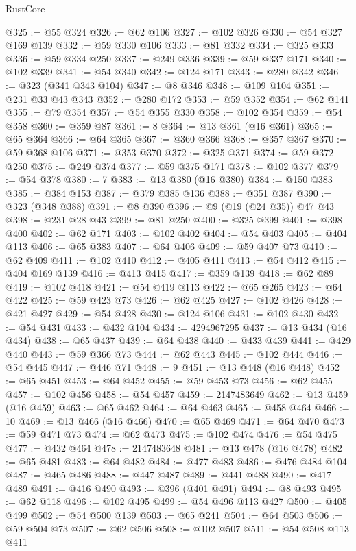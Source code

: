 \begin{lexlean}{RustCore}
\begin{coremodule}
@325 := @55 @324
@326 := @62 @106
@327 := @102 @326
@330 := @54 @327 @169 @139
@332 := @59 @330 @106
@333 := @81 @332
@334 := @325 @333
@336 := @59 @334 @250
@337 := @249 @336
@339 := @59 @337 @171
@340 := @102 @339
@341 := @54 @340
@342 := @124 @171
@343 := @280 @342
@346 := @323 (@341 @343 @104)
@347 := @8 @346
@348 := @109 @104
@351 := @231 @33 @43 @343
@352 := @280 @172
@353 := @59 @352
@354 := @62 @141
@355 := @79 @354
@357 := @54 @355 @330
@358 := @102 @354
@359 := @54 @358
@360 := @359 @87
@361 := 8
@364 := @13 @361 (@16 @361)
@365 := @65 @364
@366 := @64 @365
@367 := @360 @366
@368 := @357 @367
@370 := @59 @368 @106
@371 := @353 @370
@372 := @325 @371
@374 := @59 @372 @250
@375 := @249 @374
@377 := @59 @375 @171
@378 := @102 @377
@379 := @54 @378
@380 := 7
@383 := @13 @380 (@16 @380)
@384 := @150 @383
@385 := @384 @153
@387 := @379 @385 @136
@388 := @351 @387
@390 := @323 (@348 @388)
@391 := @8 @390
@396 := @9 (@19 (@24 @35)) @47 @43
@398 := @231 @28 @43
@399 := @81 @250
@400 := @325 @399
@401 := @398 @400
@402 := @62 @171
@403 := @102 @402
@404 := @54 @403
@405 := @404 @113
@406 := @65 @383
@407 := @64 @406
@409 := @59 @407 @73
@410 := @62 @409
@411 := @102 @410
@412 := @405 @411
@413 := @54 @412
@415 := @404 @169 @139
@416 := @413 @415
@417 := @359 @139
@418 := @62 @89
@419 := @102 @418
@421 := @54 @419 @113
@422 := @65 @265
@423 := @64 @422
@425 := @59 @423 @73
@426 := @62 @425
@427 := @102 @426
@428 := @421 @427
@429 := @54 @428
@430 := @124 @106
@431 := @102 @430
@432 := @54 @431
@433 := @432 @104
@434 := 4294967295
@437 := @13 @434 (@16 @434)
@438 := @65 @437
@439 := @64 @438
@440 := @433 @439
@441 := @429 @440
@443 := @59 @366 @73
@444 := @62 @443
@445 := @102 @444
@446 := @54 @445
@447 := @446 @71
@448 := 9
@451 := @13 @448 (@16 @448)
@452 := @65 @451
@453 := @64 @452
@455 := @59 @453 @73
@456 := @62 @455
@457 := @102 @456
@458 := @54 @457
@459 := 2147483649
@462 := @13 @459 (@16 @459)
@463 := @65 @462
@464 := @64 @463
@465 := @458 @464
@466 := 10
@469 := @13 @466 (@16 @466)
@470 := @65 @469
@471 := @64 @470
@473 := @59 @471 @73
@474 := @62 @473
@475 := @102 @474
@476 := @54 @475
@477 := @432 @464
@478 := 2147483648
@481 := @13 @478 (@16 @478)
@482 := @65 @481
@483 := @64 @482
@484 := @477 @483
@486 := @476 @484 @104
@487 := @465 @486
@488 := @447 @487
@489 := @441 @488
@490 := @417 @489
@491 := @416 @490
@493 := @396 (@401 @491)
@494 := @8 @493
@495 := @62 @118
@496 := @102 @495
@499 := @54 @496 @113 @427
@500 := @405 @499
@502 := @54 @500 @139
@503 := @65 @241
@504 := @64 @503
@506 := @59 @504 @73
@507 := @62 @506
@508 := @102 @507
@511 := @54 @508 @113 @411

\end{coremodule}
\end{lexlean}
